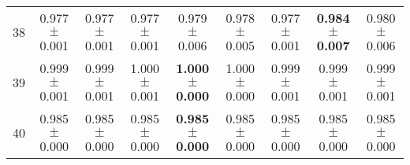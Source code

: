 \begin{table}[!ht]
{\begin{tabular}{r c c c c c c c c}
38 & 0.977 $\pm$ 0.001 & 0.977 $\pm$ 0.001 & 0.977 $\pm$ 0.001 & 0.979 $\pm$ 0.006 & 0.978 $\pm$ 0.005 & 0.977 $\pm$ 0.001 & \textbf{0.984 $\pm$ 0.007} & 0.980 $\pm$ 0.006 \\
39 & 0.999 $\pm$ 0.001 & 0.999 $\pm$ 0.001 & 1.000 $\pm$ 0.001 & \textbf{1.000 $\pm$ 0.000} & 1.000 $\pm$ 0.000 & 0.999 $\pm$ 0.001 & 0.999 $\pm$ 0.001 & 0.999 $\pm$ 0.001 \\
40 & 0.985 $\pm$ 0.000 & 0.985 $\pm$ 0.000 & 0.985 $\pm$ 0.000 & \textbf{0.985 $\pm$ 0.000} & 0.985 $\pm$ 0.000 & 0.985 $\pm$ 0.000 & 0.985 $\pm$ 0.000 & 0.985 $\pm$ 0.000 \\
\end{tabular}}
\end{table}
